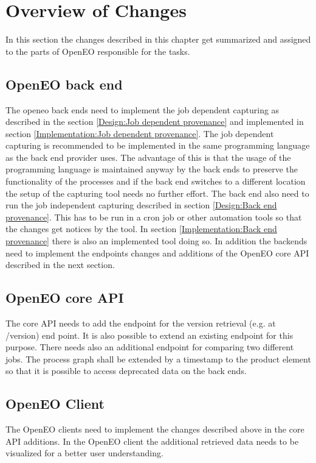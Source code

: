 \documentclass[draft,final]{vutinfth} %
\begin{document}
\section{Overview of Changes}\label{Design:Overview of Changes}
In this section the changes described in this chapter get summarized and assigned to the parts of OpenEO responsible for the tasks.

\subsection{OpenEO back end}\label{Design:OpenEO back end}
The openeo back ends need to implement the job dependent capturing as described in the section \ref{Design:Job dependent provenance} and implemented in section \ref{Implementation:Job dependent provenance}. The job dependent capturing is recommended to be implemented in the same programming language as the back end provider uses. The advantage of this is that the usage of the programming language is maintained anyway by the back ends to preserve the functionality of the processes and if the back end switches to a different location the setup of the capturing tool needs no further effort. 
The back end also need to run the job independent capturing described in section \ref{Design:Back end provenance}. This has to be run in a cron job or other automation tools so that the changes get notices by the tool. In section \ref{Implementation:Back end provenance} there is also an implemented tool doing so. 
In addition the backends need to implement the endpoints changes and additions of the OpenEO core API described in the next section.
\subsection{OpenEO core API}\label{Design:OpenEO core API}
The core API needs to add the endpoint for the version retrieval (e.g. at /version) end point. It is also possible to extend an existing endpoint for this purpose. 
There needs also an additional endpoint for comparing two different jobs. 
The process graph shall be extended by a timestamp to the product element so that it is possible to access deprecated data on the back ends.
\subsection{OpenEO Client}\label{Design:OpenEO Client}
The OpenEO clients need to implement the changes described above in the core API additions. In the OpenEO client the additional retrieved data needs to be visualized for a better user understanding.
\end{document}
